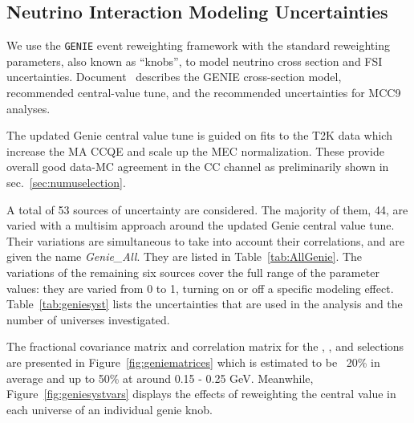 \subsection{Neutrino Interaction Modeling Uncertainties }
\label{sec:systematics:xsec}

We use the \texttt{GENIE} event reweighting framework with the standard reweighting parameters, also known as ``knobs'', to model neutrino cross section and FSI uncertainties. Document~\cite{bib:geniesupportnote} describes the GENIE cross-section model, recommended central-value tune, and the recommended uncertainties for MCC9 analyses. 

The updated Genie central value tune is guided on fits to the T2K data which increase the MA CCQE and scale up the MEC normalization. These provide overall good data-MC agreement in the \numu CC channel as preliminarily shown in sec.~\ref{sec:numuselection}.

A total of 53 sources of uncertainty are considered. The majority of them, 44, are varied with a multisim approach around the updated Genie central value tune. Their variations are simultaneous to take into account their correlations, and are given the name \textit{Genie\_All}. They are listed in Table~\ref{tab:AllGenie}. The variations of the remaining six sources cover the full range of the parameter values: they are varied from 0 to 1, turning on or off a specific modeling effect. Table~\ref{tab:geniesyst} lists the uncertainties that are used in the analysis and the number of universes investigated. %

The fractional covariance matrix and correlation matrix for the \npsel, \zpsel, and \numu selections are presented in Figure~\ref{fig:geniematrices} which is estimated to be ~20\% in average and up to 50\% at around 0.15 - 0.25 GeV. Meanwhile, Figure~\ref{fig:geniesystvars} displays the effects of reweighting the central value in each universe of an individual genie knob.

